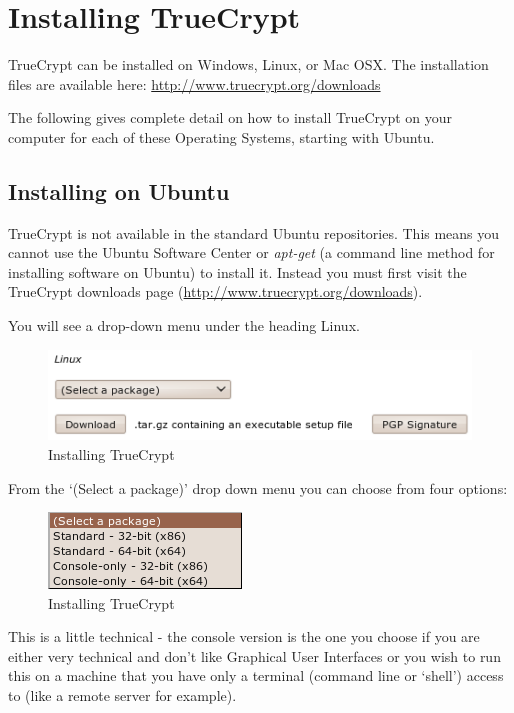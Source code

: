 \section{Installing TrueCrypt}

TrueCrypt can be installed on Windows, Linux, or Mac OSX. The
installation files are available here:
\href{http://www.truecrypt.org/downloads}{http://www.truecrypt.org/downloads}

The following gives complete detail on how to install TrueCrypt on your
computer for each of these Operating Systems, starting with Ubuntu.

\subsection{Installing on Ubuntu}

TrueCrypt is not available in the standard Ubuntu repositories. This
means you cannot use the Ubuntu Software Center or \emph{apt-get} (a
command line method for installing software on Ubuntu) to install it.
Instead you must first visit the TrueCrypt downloads page
(\href{http://www.truecrypt.org/downloads}{http://www.truecrypt.org/downloads}).

You will see a drop-down menu under the heading Linux.

\begin{figure}[htbp]
\centering
\includegraphics{tc_001.png}
\caption{Installing TrueCrypt}
\end{figure}

From the `(Select a package)' drop down menu you can choose from four
options:

\begin{figure}[htbp]
\centering
\includegraphics{tc_002.png}
\caption{Installing TrueCrypt}
\end{figure}

This is a little technical - the console version is the one you choose
if you are either very technical and don't like Graphical User
Interfaces or you wish to run this on a machine that you have only a
terminal (command line or `shell') access to (like a remote server for
example).

